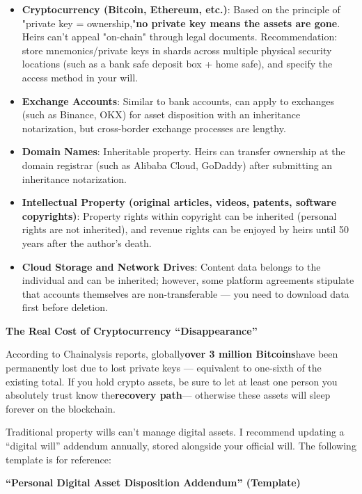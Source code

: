 \begin{itemize}
  \item \textbf{Cryptocurrency (Bitcoin, Ethereum, etc.)}: Based on the principle of "private key = ownership,"\textbf{no private key means the assets are gone}. Heirs can't appeal "on-chain" through legal documents. Recommendation: store mnemonics/private keys in shards across multiple physical security locations (such as a bank safe deposit box + home safe), and specify the access method in your will.
  \item \textbf{Exchange Accounts}: Similar to bank accounts, can apply to exchanges (such as Binance, OKX) for asset disposition with an inheritance notarization, but cross-border exchange processes are lengthy.
  \item \textbf{Domain Names}: Inheritable property. Heirs can transfer ownership at the domain registrar (such as Alibaba Cloud, GoDaddy) after submitting an inheritance notarization.
  \item \textbf{Intellectual Property (original articles, videos, patents, software copyrights)}: Property rights within copyright can be inherited (personal rights are not inherited), and revenue rights can be enjoyed by heirs until 50 years after the author's death.
  \item \textbf{Cloud Storage and Network Drives}: Content data belongs to the individual and can be inherited; however, some platform agreements stipulate that accounts themselves are non-transferable — you need to download data first before deletion.
\end{itemize}

\textbf{The Real Cost of Cryptocurrency “Disappearance”}\par

According to Chainalysis reports, globally\textbf{over 3 million Bitcoins}have been permanently lost due to lost private keys — equivalent to one-sixth of the existing total. If you hold crypto assets, be sure to let at least one person you absolutely trust know the\textbf{recovery path}— otherwise these assets will sleep forever on the blockchain.


Traditional property wills can't manage digital assets. I recommend updating a “digital will” addendum annually, stored alongside your official will. The following template is for reference:

\textbf{“Personal Digital Asset Disposition Addendum” (Template)}\par

